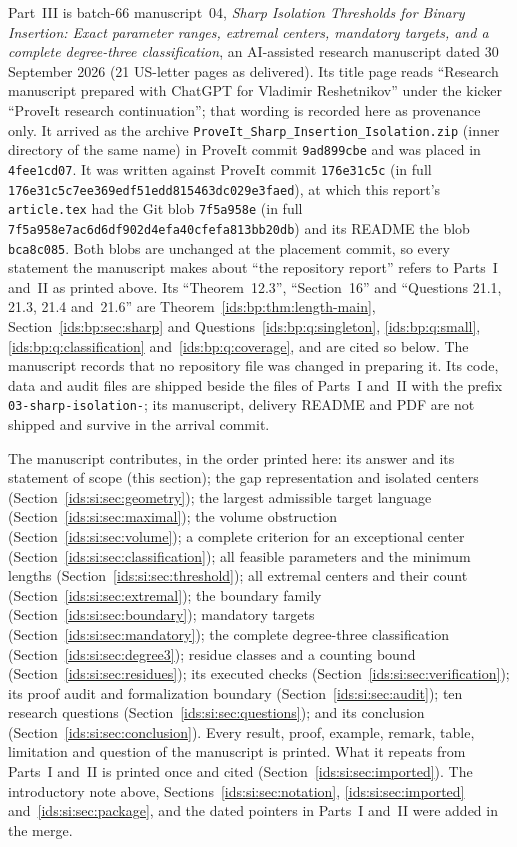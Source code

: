 \documentclass[11pt,letterpaper]{article}
\theoremstyle{definition}\newtheorem{definition}[theorem]{Definition}
\theoremstyle{remark}\newtheorem{remark}[theorem]{Remark}
\theoremstyle{definition}\newtheorem{question}[theorem]{Question}
\begin{document}
Part~III is batch-66 manuscript~04, \emph{Sharp Isolation Thresholds for
Binary Insertion: Exact parameter ranges, extremal centers, mandatory
targets, and a complete degree-three classification}, an AI-assisted research
manuscript dated 30 September 2026 (21 US-letter pages as delivered). Its title
page reads ``Research manuscript prepared with ChatGPT for Vladimir
Reshetnikov'' under the kicker ``ProveIt research continuation''; that
wording is recorded here as provenance only. It arrived as the archive
\texttt{ProveIt\_Sharp\_Insertion\_Isolation.zip} (inner directory of the same
name) in ProveIt commit \texttt{9ad899cbe} and was placed in
\texttt{4fee1cd07}. It was written against ProveIt commit \texttt{176e31c5c}
(in full \nolinkurl{176e31c5c7ee369edf51edd815463dc029e3faed}), at which this
report's \texttt{article.tex} had the Git blob \texttt{7f5a958e} (in full
\nolinkurl{7f5a958e7ac6d6df902d4efa40cfefa813bb20db}) and its README the blob
\texttt{bca8c085}. Both blobs are unchanged at the placement commit, so every
statement the manuscript makes about ``the repository report'' refers to
Parts~I and~II as printed above. Its ``Theorem~12.3'', ``Section~16'' and
``Questions 21.1, 21.3, 21.4 and~21.6'' are
Theorem~\ref{ids:bp:thm:length-main}, Section~\ref{ids:bp:sec:sharp} and
Questions~\ref{ids:bp:q:singleton}, \ref{ids:bp:q:small},
\ref{ids:bp:q:classification} and~\ref{ids:bp:q:coverage}, and are cited so
below. The manuscript records that no repository file was changed in
preparing it. Its code, data and audit files are shipped beside the files of
Parts~I and~II with the prefix \nolinkurl{03-sharp-isolation-}; its
manuscript, delivery README and PDF are not shipped and survive in the arrival
commit.

The manuscript contributes, in the order printed here: its answer and its
statement of scope (this section); the gap representation and isolated centers
(Section~\ref{ids:si:sec:geometry}); the largest admissible target language
(Section~\ref{ids:si:sec:maximal}); the volume obstruction
(Section~\ref{ids:si:sec:volume}); a complete criterion for an exceptional
center (Section~\ref{ids:si:sec:classification}); all feasible parameters and
the minimum lengths (Section~\ref{ids:si:sec:threshold}); all extremal centers
and their count (Section~\ref{ids:si:sec:extremal}); the boundary family
(Section~\ref{ids:si:sec:boundary}); mandatory targets
(Section~\ref{ids:si:sec:mandatory}); the complete degree-three classification
(Section~\ref{ids:si:sec:degree3}); residue classes and a counting bound
(Section~\ref{ids:si:sec:residues}); its executed checks
(Section~\ref{ids:si:sec:verification}); its proof audit and formalization
boundary (Section~\ref{ids:si:sec:audit}); ten research questions
(Section~\ref{ids:si:sec:questions}); and its conclusion
(Section~\ref{ids:si:sec:conclusion}). Every result, proof, example, remark,
table, limitation and question of the manuscript is printed. What it repeats
from Parts~I and~II is printed once and cited
(Section~\ref{ids:si:sec:imported}). The introductory note above,
Sections~\ref{ids:si:sec:notation}, \ref{ids:si:sec:imported}
and~\ref{ids:si:sec:package}, and the dated pointers in Parts~I and~II were
added in the merge.
\end{document}
